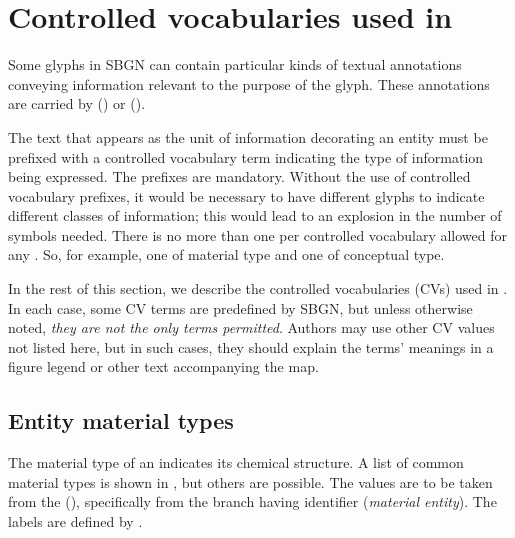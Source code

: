 
\section{Controlled vocabularies used in \SBGNERLone}\label{sec:CVs}

Some glyphs in SBGN \ERs can contain particular kinds of textual annotations conveying information relevant to the purpose of the glyph.  These annotations are carried by  () or  ().

The text that appears as the unit of information decorating an entity must be prefixed with a controlled vocabulary term indicating the type of information being expressed.  The prefixes are mandatory.  Without the use of controlled vocabulary prefixes, it would be necessary to have different glyphs to indicate different classes of information; this would lead to an explosion in the number of symbols needed. There is no more than one  per controlled vocabulary allowed for any . So, for example, one  of material type and one  of conceptual type.

In the rest of this section, we describe the controlled vocabularies (CVs) used in \SBGNERLone.  In each case, some CV terms are predefined by SBGN, but unless otherwise noted, \emph{they are not the only terms permitted}.  Authors may use other CV values not listed here, but in such cases, they should explain the terms' meanings in a figure legend or other text accompanying the map.

\subsection{Entity material types}
\label{sec:material-types-cv}

The material type of an  indicates its chemical structure.  A list of common material types is shown in , but others are possible.  The values are to be taken from the \sbo (\sbourl), specifically from the branch having identifier  (\emph{material entity}).  The labels are defined by \SBGNERLone.

